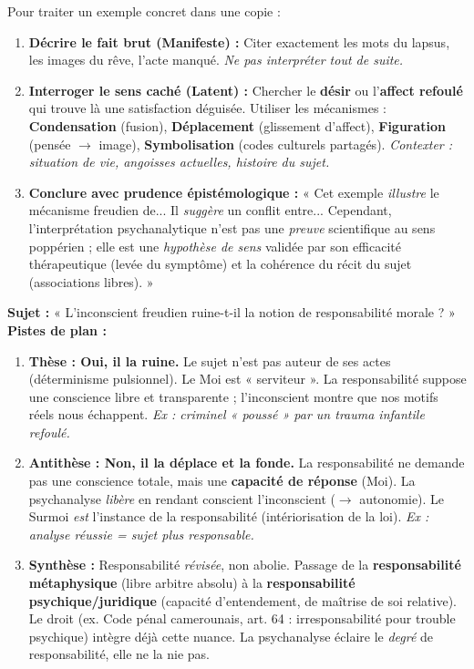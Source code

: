 \documentclass[11pt]{article}
\begin{document}
\begin{methode}
Pour traiter un exemple concret dans une copie :
\begin{enumerate}
    \item \textbf{Décrire le fait brut (Manifeste) :} Citer exactement les mots du lapsus, les images du rêve, l'acte manqué. \emph{Ne pas interpréter tout de suite.}
    \item \textbf{Interroger le sens caché (Latent) :} Chercher le \textbf{désir} ou l'\textbf{affect refoulé} qui trouve là une satisfaction déguisée. Utiliser les mécanismes : \textbf{Condensation} (fusion), \textbf{Déplacement} (glissement d'affect), \textbf{Figuration} (pensée $\rightarrow$ image), \textbf{Symbolisation} (codes culturels partagés). \emph{Contexter : situation de vie, angoisses actuelles, histoire du sujet.}
    \item \textbf{Conclure avec prudence épistémologique :} « Cet exemple \emph{illustre} le mécanisme freudien de... Il \emph{suggère} un conflit entre... Cependant, l'interprétation psychanalytique n'est pas une \emph{preuve} scientifique au sens poppérien ; elle est une \emph{hypothèse de sens} validée par son efficacité thérapeutique (levée du symptôme) et la cohérence du récit du sujet (associations libres). »
\end{enumerate}
\end{methode}

\begin{exercice}
\textbf{Sujet :} « L'inconscient freudien ruine-t-il la notion de responsabilité morale ? »
\textbf{Pistes de plan :}
\begin{enumerate}
    \item \textbf{Thèse : Oui, il la ruine.} Le sujet n'est pas auteur de ses actes (déterminisme pulsionnel). Le Moi est « serviteur ». La responsabilité suppose une conscience libre et transparente ; l'inconscient montre que nos motifs réels nous échappent. \emph{Ex : criminel « poussé » par un trauma infantile refoulé.}
    \item \textbf{Antithèse : Non, il la déplace et la fonde.} La responsabilité ne demande pas une conscience totale, mais une \textbf{capacité de réponse} (Moi). La psychanalyse \emph{libère} en rendant conscient l'inconscient ($\rightarrow$ autonomie). Le Surmoi \emph{est} l'instance de la responsabilité (intériorisation de la loi). \emph{Ex : analyse réussie = sujet plus responsable.}
    \item \textbf{Synthèse :} Responsabilité \emph{révisée}, non abolie. Passage de la \textbf{responsabilité métaphysique} (libre arbitre absolu) à la \textbf{responsabilité psychique/juridique} (capacité d'entendement, de maîtrise de soi relative). Le droit (ex. Code pénal camerounais, art. 64 : irresponsabilité pour trouble psychique) intègre déjà cette nuance. La psychanalyse éclaire le \emph{degré} de responsabilité, elle ne la nie pas.
\end{enumerate}
\end{exercice}
\end{document}
